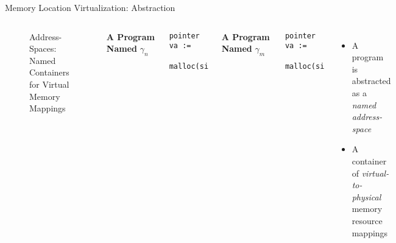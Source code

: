\documentclass[aspectratio=169,xcolor=dvipsnames]{beamer}
\begin{document}
\begin{frame}[fragile]{Memory Location Virtualization: Abstraction}
\begin{columns}[c]
\begin{figure}
\begin{tikzpicture}[x=0.75pt,y=0.75pt,yscale=-0.5,xscale=0.5]
\end{tikzpicture}



      \caption{Address-Spaces: Named Containers for Virtual Memory Mappings}
    \label{fig:enter-label}
\end{figure}

        \begin{columns}[c]
            \textbf{A Program Named} $\gamma_n$
            \begin{lstlisting}[style=CStyleNum,mathescape]
    pointer va :=
     malloc(size)
\end{lstlisting}
            \textbf{A Program Named} $\gamma_m$
            \begin{lstlisting}[style=CStyleNum,mathescape]
    pointer va := 
     malloc(size)
\end{lstlisting}
        \end{columns}
        \begin{itemize}
      \item  A program is abstracted as a \emph{named address-space}
      \item A container of \emph{virtual-to-physical} memory resource mappings
\end{itemize}
    \end{columns}
\end{frame}


\end{document}
